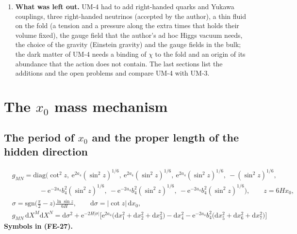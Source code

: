 \documentclass[
  10pt,
]{article}
\begin{document}
\begin{enumerate}
  gives no such bound and allows closed time-like curves. The primordial
  era: the author's vacuum is not a solution; the exact de Sitter fold
  inflates the extra times as well; an inflation with frozen extra times
  needs a Weyl tensor of the bulk and, in the regime of general
  relativity, a rate below \(H/10\); the inflaton is not specified. The
  neutrinos: the Dirac phase drops out of every result; the lightest
  mass is below 23 meV and changes only the capture rate of the cosmic
  neutrinos (DERIVED, ESTIMATE; OPEN: the stability of the gas, a
  unitary coupling, the gauge principle, the inflaton).
\item
  \textbf{What was left out.} UM-4 had to add right-handed quarks and
  Yukawa couplings, three right-handed neutrinos (accepted by the
  author), a thin fluid on the fold (a tension and a pressure along the
  extra times that holds their volume fixed), the gauge field that the
  author's ad hoc Higgs vacuum needs, the choice of the gravity
  (Einstein gravity) and the gauge fields in the bulk; the dark matter
  of UM-4 needs a binding of \(\chi\) to the fold and an origin of its
  abundance that the action does not contain. The last sections list the
  additions and the open problems and compare UM-4 with UM-3.
\end{enumerate}

\hypertarget{the-x_0-mass-mechanism}{%
\section{\texorpdfstring{The \(x_0\) mass
mechanism}{The x\_0 mass mechanism}}\label{the-x_0-mass-mechanism}}

\hypertarget{the-period-of-x_0-and-the-proper-length-of-the-hidden-direction}{%
\subsection{\texorpdfstring{The period of \(x_0\) and the proper length
of the hidden
direction}{The period of x\_0 and the proper length of the hidden direction}}\label{the-period-of-x_0-and-the-proper-length-of-the-hidden-direction}}

\[
\begin{aligned}
&g_{MN} = \mathrm{diag}\Big(\cot^2z,\ \mathrm{e}^{2a_4}(\sin^2z)^{1/6},\ \mathrm{e}^{2a_4}(\sin^2z)^{1/6},
 \ \mathrm{e}^{2a_4}(\sin^2z)^{1/6},\ -(\sin^2z)^{1/6},\\
&\qquad\qquad -\mathrm{e}^{-2a_4}b_4^2(\sin^2z)^{1/6},\ -\mathrm{e}^{-2a_4}b_4^2(\sin^2z)^{1/6},
 \ -\mathrm{e}^{-2a_4}b_4^2(\sin^2z)^{1/6}\Big),\qquad z = 6Hx_0,\\
&\sigma = \mathrm{sgn}\Big(\frac{\pi}{2} - z\Big)\frac{\ln\sin z}{6H},\qquad \mathrm{d}\sigma = \lvert\cot z\rvert\,\mathrm{d}x_0,\\
&g_{MN}\,\mathrm{d}X^M\mathrm{d}X^N = \mathrm{d}\sigma^2 + \mathrm{e}^{-2H\lvert\sigma\rvert}\Big[\mathrm{e}^{2a_4}\big(\mathrm{d}x_1^2
 + \mathrm{d}x_2^2 + \mathrm{d}x_3^2\big) - \mathrm{d}x_4^2 - \mathrm{e}^{-2a_4}b_4^2\big(\mathrm{d}x_5^2 + \mathrm{d}x_6^2 + \mathrm{d}x_7^2\big)\Big]
\end{aligned} \tag{FE-27}
\] \textbf{Symbols in (FE-27).}
\end{document}
